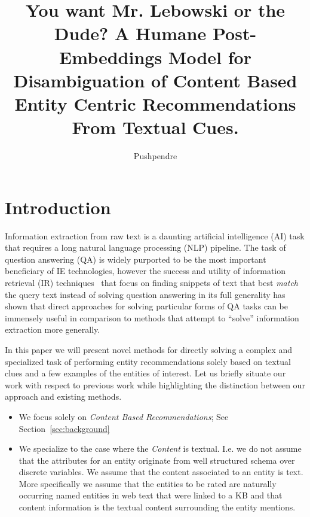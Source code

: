 \documentclass{article}
\title{You want Mr. Lebowski or the Dude? A Humane Post-Embeddings Model for Disambiguation
  of Content Based Entity Centric Recommendations From Textual Cues.}
\author{Pushpendre}
\newcommand{\secref}[1]{Section~\ref{#1}}
\begin{document}
\maketitle
\begin{abstract}

\end{abstract}
\section{Introduction}
\label{sec:introduction}
Information extraction from raw text is a daunting artificial intelligence (AI)
task that requires a long natural language processing (NLP) pipeline. The task
of question answering (QA) is widely purported to be the most important beneficiary
of IE technologies, however the success and utility of information retrieval
(IR) techniques~\cite{manning2008introduction} that focus on finding snippets of text that
best \textit{match} the query text
instead of solving question answering in its
full generality has shown that direct approaches for solving
particular forms of QA tasks can be immensely useful in comparison to methods
that attempt to ``solve'' information extraction more generally.

In this paper we will present novel methods for directly solving a complex and
specialized task of performing entity recommendations solely based on textual
clues and a few examples of the entities of interest.
Let us briefly situate our work with respect to previous work while highlighting the
distinction between our approach and existing methods.
\begin{itemize}
\item We focus solely on \textit{Content Based Recommendations}; See
  \secref{sec:background}
\item We specialize to the case where the \textit{Content} is textual. I.e. we
  do not assume that the attributes for an entity originate from well structured
  schema over discrete variables. We assume that the content associated to an
  entity is text. More specifically we assume that the entities to be rated are
  naturally occurring named entities in web text that were linked to a KB and
  that content information is the textual content surrounding the entity
  mentions.
\end{itemize}
\end{document}
